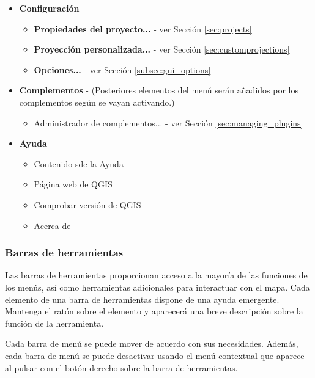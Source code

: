 \begin{itemize}
\item \textbf{Configuración}
\begin{itemize}
\item \textbf{Propiedades del proyecto...}  - ver Sección \ref{sec:projects}
\item \textbf{Proyección personalizada...}   - ver Sección \ref{sec:customprojections}
\item \textbf{Opciones...}             - ver Sección \ref{subsec:gui_options}
\end{itemize}

\item \textbf{Complementos} - (Posteriores elementos del menú serán añadidos por los complementos según se vayan activando.)
\begin{itemize}
\item Administrador de complementos...       - ver Sección \ref{sec:managing_plugins}
\end{itemize}          	

\item \textbf{Ayuda}
\begin{itemize}
\item Contenido sde la Ayuda
\item Página web de QGIS
\item Comprobar versión de QGIS 
\item Acerca de
\end{itemize}

\end{itemize}


\subsubsection{Barras de herramientas}\label{label_toolbars}

Las barras de herramientas proporcionan acceso a la mayoría de las funciones de los menús, así como herramientas 
adicionales para interactuar con el mapa. Cada elemento de una barra de herramientas dispone de una ayuda 
emergente. Mantenga el ratón sobre el elemento y aparecerá una breve descripción sobre la función de la herramienta.

Cada barra de menú se puede mover de acuerdo con sus necesidades. Además, cada barra de menú se puede desactivar 
usando el menú contextual que aparece al pulsar con el botón derecho sobre la barra de herramientas.

